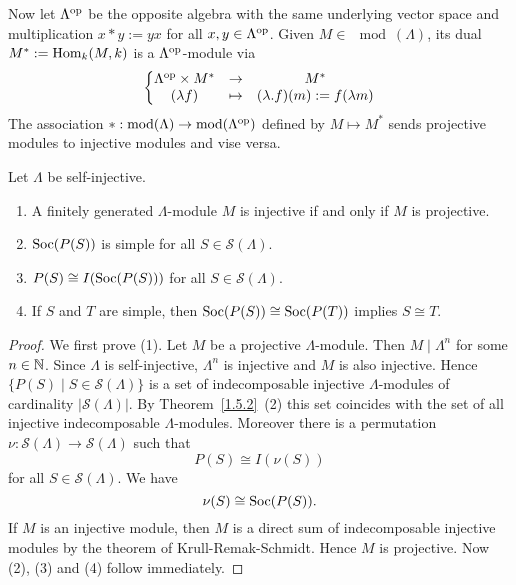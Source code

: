 
\begin{remark}\label{1.5.2.1}
Now let $\Lambda^{\mathrm{op}}$ be the opposite algebra with the same underlying vector space and multiplication $x*y:=yx$ for all $x,y\in\Lambda^{\mathrm{op}}$. Given $M\in\mod(\Lambda)$, its dual $M^*:=\operatorname{Hom}_k(M,k)$ is a $\Lambda^{\mathrm{op}}$-module via
\[
\left\{ \begin{matrix} \Lambda^{\mathrm{op}}\times M^* & \to & M^* \\ (\lambda f) & \mapsto & (\lambda.f)(m):=f(\lambda m) \end{matrix} \right.
\]
The association $*:\operatorname{mod}(\Lambda)\to \operatorname{mod}(\Lambda^{\mathrm{op}})$ defined by $M\mapsto M^*$ sends projective modules to injective modules and vise versa.
\end{remark}


\begin{lemma}\label{1.5.3}
Let $\Lambda$ be self-injective.
\begin{enumerate}
\item A finitely generated $\Lambda$-module $M$ is injective if and only if $M$ is projective.
\item $\operatorname{Soc}(P(S))$ is simple for all $S\in\mathcal S(\Lambda)$.
\item $P(S)\cong I(\operatorname{Soc}(P(S)))$ for all $S\in\mathcal S(\Lambda)$.
\item If $S$ and $T$ are simple, then $\operatorname{Soc}(P(S))\cong \operatorname{Soc}(P(T))$ implies $S\cong T$.
\end{enumerate}
\end{lemma}


\begin{proof}
We first prove (1). Let $M$ be a projective $\Lambda$-module. Then $M\mid \Lambda^n$ for some $n\in\mathbb{N}$. Since $\Lambda$ is self-injective, $\Lambda^n$ is injective and $M$ is also injective. Hence $\{P(S)\mid S\in\mathcal S(\Lambda)\}$ is a set of indecomposable injective $\Lambda$-modules of cardinality $|\mathcal S(\Lambda)|$. By Theorem~\ref{1.5.2}~(2) this set coincides with the set of all injective indecomposable $\Lambda$-modules. Moreover there is a permutation $\nu:\mathcal S(\Lambda)\to \mathcal S(\Lambda)$ such that
\[
P(S) \cong I(\nu(S))
\]
for all $S\in\mathcal S(\Lambda)$. We have
\[
\nu(S)\cong\operatorname{Soc}(P(S)).
\]
If $M$ is an injective module, then $M$ is a direct sum of indecomposable injective modules by the theorem of Krull-Remak-Schmidt. Hence $M$ is projective. Now (2), (3) and (4) follow immediately.
\end{proof}

